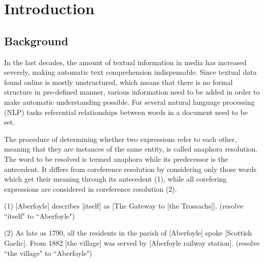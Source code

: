 \chapter{Introduction}
\label{sec:Introduction}

\section{Background}

In the last decades, the amount of textual information in media has increased severely, making automatic text comprehension indispensable. Since textual data found online is mostly unstructured, which means that there is no formal structure in pre-defined manner, various information need to be added in order to make automatic understanding possible. For several natural language processing (NLP) tasks referential relationships between words  in a document need to be set. 

The procedure of determining whether two expressions  refer to each other, meaning that they are instances of the same entity, is called anaphora resolution. The word to be resolved is termed anaphora while its predecessor is the antecedent. It differs from coreference resolution by considering only those words which get their meaning through its antecedent \citep{recasens2007anaphora} (1), while all corefering expressions are considered in coreference resolution (2).

\begin{addmargin}[1cm]{1cm}
(1) [Aberfoyle] describes [itself] as [The Gateway to [the Trossachs]]. (resolve “itself" to “Aberfoyle")

(2) As late as 1790, all the residents in the parish of [Aberfoyle] spoke [Scottish Gaelic]. From 1882 [the village] was served by [Aberfoyle railway station]. (resolve “the village"  to “Aberfoyle")
\end{addmargin}

